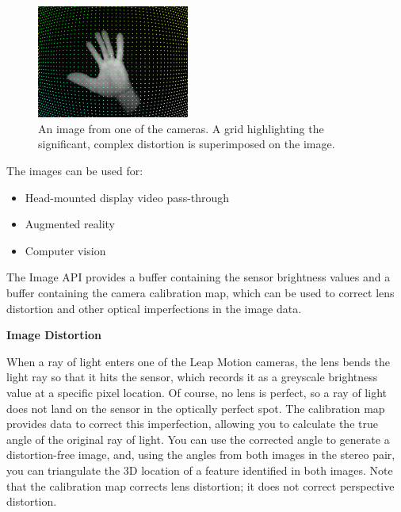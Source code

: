 \documentclass[journal]{IEEEtran}										    %
\begin{document}
                \begin{figure}[h]
                    \centering
                    \includegraphics[width=5cm]{Leap-Image-Raw}
                    \caption{An image from one of the cameras. A grid highlighting 
                    the significant, complex distortion is superimposed on the image.}
                    \label{fig:leapCam1}
                \end{figure}
                The images can be used for:
                \begin{itemize}
                    \item Head-mounted display video pass-through
                    \item Augmented reality
                    \item Computer vision 
                \end{itemize} 
                The Image API provides a buffer containing the sensor brightness
                values and a buffer containing the camera calibration map, 
                which can be used to correct lens distortion and other optical 
                imperfections in the image data.  \\

                \begin{large}
                    \textbf{Image Distortion}
                \end{large}

                When a ray of light enters one of the Leap Motion cameras, the 
                lens bends the light ray so that it hits the sensor, which records 
                it as a greyscale brightness value at a specific pixel location. 
                Of course, no lens is perfect, so a ray of light does not land 
                on the sensor in the optically perfect spot. The calibration 
                map provides data to correct this imperfection, allowing you to 
                calculate the true angle of the original ray of light. You can 
                use the corrected angle to generate a distortion-free image, and, 
                using the angles from both images in the stereo pair, you can 
                triangulate the 3D location of a feature identified in both images. 
                Note that the calibration map corrects lens distortion; it does 
                not correct perspective distortion.
\end{document}
